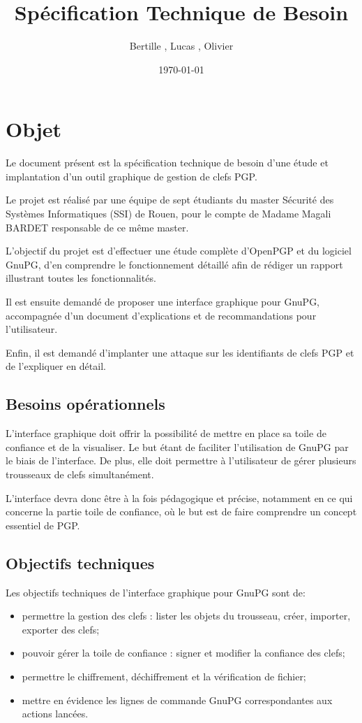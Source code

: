 \documentclass{../res/univ-projet}
\title{Spécification Technique de Besoin}
\author{Bertille \bsc{Bouillie}, Lucas \bsc{Barbay}, Olivier \bsc{Thibault}}
\date{\today}
\begin{document}
\maketitle
\newpage
\tableofcontents

\newpage

\section{Objet}

Le document présent est la spécification technique de besoin d'une étude et implantation d'un outil graphique de gestion de clefs PGP.

Le projet est réalisé par une équipe de sept étudiants du master Sécurité des Systèmes Informatiques (SSI) de Rouen, pour le compte de Madame Magali BARDET responsable de ce même master. 

L'objectif du projet est d'effectuer une étude complète d'OpenPGP et du logiciel GnuPG, d'en comprendre le fonctionnement détaillé afin de rédiger un rapport illustrant toutes les fonctionnalités.

Il est ensuite demandé de proposer une interface graphique pour GnuPG, accompagnée d'un document d'explications et de recommandations pour l'utilisateur.

Enfin, il est demandé d'implanter une attaque sur les identifiants de clefs PGP et de l'expliquer en détail.

\subsection{Besoins opérationnels}
L'interface graphique doit offrir la possibilité de mettre en place sa toile de confiance et de la visualiser. Le but étant de faciliter l'utilisation de GnuPG par le biais de l'interface. De plus, elle doit permettre à l'utilisateur de gérer plusieurs trousseaux de clefs simultanément.

L'interface devra donc être à la fois pédagogique et précise, notamment en ce qui concerne la partie toile de confiance, où le but est de faire comprendre un concept essentiel de PGP.

\subsection{Objectifs techniques}

Les objectifs techniques de l'interface graphique pour GnuPG sont de:
\begin{itemize}
 \item permettre la gestion des clefs : lister les objets du trousseau, créer, importer, exporter des clefs;
 \item pouvoir gérer la toile de confiance : signer et modifier la confiance des clefs;
 \item permettre le chiffrement, déchiffrement et la vérification de fichier;
 \item mettre en évidence les lignes de commande GnuPG correspondantes aux actions lancées.
\end{itemize}
\end{document}

